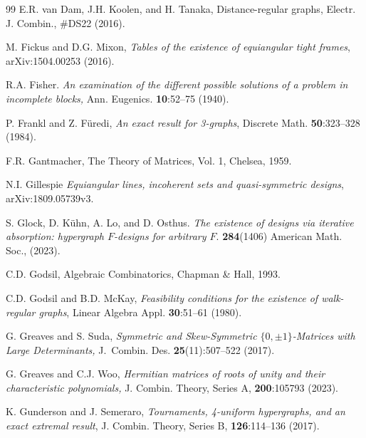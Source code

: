 \documentclass[11pt]{article}
\begin{document}
\begin{thebibliography}{99}
E.R. van Dam, J.H. Koolen, and H. Tanaka, Distance-regular graphs, Electr. J. Combin., \#DS22 (2016).


M. Fickus and D.G. Mixon, \emph{Tables of the existence of equiangular tight frames}, arXiv:1504.00253 (2016).

R.A. Fisher. \emph{An examination of the different possible solutions of a problem in incomplete blocks,}  Ann. Eugenics. {\bf 10}:52--75 (1940).

P. Frankl and Z. F\"{u}redi, 
\emph{An exact result for 3-graphs}, 
Discrete Math. {\bf50}:323--328 (1984).

F.R. Gantmacher, The Theory of Matrices, Vol. 1, Chelsea, 1959.

N.I. Gillespie
\textit{Equiangular lines, incoherent sets and quasi-symmetric designs}, 
arXiv:1809.05739v3. 

S. Glock, D. Kühn, A. Lo, and D. Osthus. \textit{The existence of designs via iterative absorption: hypergraph $F$-designs for arbitrary $F$}. \textbf{284}(1406) American Math. Soc., (2023).


C.D. Godsil, Algebraic Combinatorics, Chapman \& Hall, 1993.

C.D. Godsil and B.D. McKay, 
\emph{Feasibility conditions for the existence of walk-regular graphs}, 
Linear Algebra Appl. \textbf{30}:51--61 (1980).


G. Greaves and  S. Suda, 
\emph{Symmetric and Skew-Symmetric $\{0,\pm 1\}$-Matrices with Large Determinants,}  J.\ Combin. Des. {\bf 25}(11):507--522 (2017). 

G. Greaves and  C.J. Woo, 
\emph{Hermitian matrices of roots of unity and their characteristic polynomials,}  J. Combin. Theory, Series A, {\bf 200}:105793 (2023). 

K. Gunderson and J. Semeraro, 
\emph{Tournaments, 4-uniform hypergraphs, and an exact extremal
result}, J. Combin. Theory, Series B, {\bf 126}:114--136 (2017).


\end{thebibliography}
\end{document}
